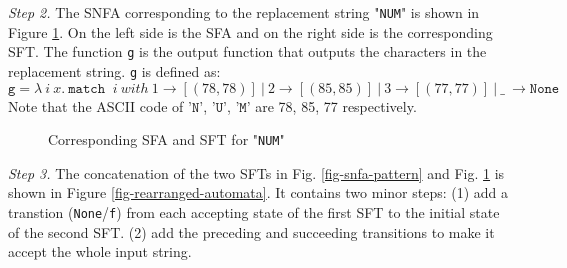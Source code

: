 \documentclass[a4paper,UKenglish,cleveref, autoref, anonymous, thm-restate]{lipics-v2021}
\begin{document}
\noindent\emph{Step 2.}
The SNFA corresponding to the replacement string "\texttt{NUM}" is shown in Figure \ref{fig-snfa-replacement}. On the left side is the SFA and on the right side is the corresponding SFT. The function \texttt{g} is the output function that outputs the characters in the replacement string. \texttt{g} is defined as:
\[
\texttt{g} = \lambda~i~x.~\texttt{match }~i~ with~ 1 \rightarrow [(78, 78)] ~|~ 2 \rightarrow [(85, 85)] ~|~ 3 \rightarrow [(77, 77)] ~|~ \_ ~\rightarrow \texttt{None}
\]
Note that the ASCII code of  $\texttt{'N'}$, $\texttt{'U'}$, $\texttt{'M'}$ are 78, 85, 77 respectively.


\begin{figure}[h] \centering
{}
\caption{Corresponding SFA and SFT for "\texttt{NUM}"}
\label{fig-snfa-replacement}
\end{figure}


\noindent\emph{Step 3.}
The concatenation of the two SFTs in Fig. \ref{fig-snfa-pattern} and Fig. \ref{fig-snfa-replacement} is shown in Figure \ref{fig-rearranged-automata}. It contains two minor steps: (1) add a transtion (\texttt{None}/\texttt{f}) from each accepting state of the first SFT to the initial state of the second SFT. (2) add the preceding and succeeding transitions to make it accept the whole input string.
\end{document}
